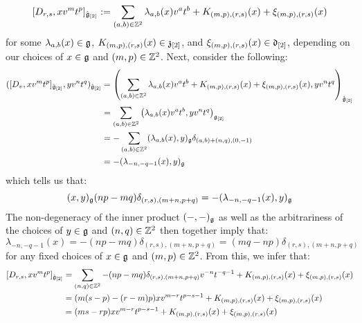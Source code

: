 \begin{remark}
\begin{enumerate}
                    $$[D_{r, s}, x v^m t^p]_{\hat{\mathfrak{g}}_{[2]}} := \sum_{(a, b) \in \mathbb{Z}^2} \lambda_{a, b}(x) v^a t^b + K_{(m, p), (r, s)}(x) + \xi_{(m, p), (r, s)}(x)$$
                for some $\lambda_{a, b}(x) \in \mathfrak{g}$, $K_{(m, p), (r, s)}(x) \in \mathfrak{z}_{[2]}$, and $\xi_{(m, p), (r, s)}(x) \in \mathfrak{d}_{[2]}$, depending on our choices of $x \in \mathfrak{g}$ and $(m, p) \in \mathbb{Z}^2$. Next, consider the following:
                    $$
                        \begin{aligned}
                            ( [D_v, x v^m t^p]_{\hat{\mathfrak{g}}_{[2]}}, y v^n t^q )_{\hat{\mathfrak{g}}_{[2]}} & = \left( \sum_{(a, b) \in \mathbb{Z}^2} \lambda_{a, b}(x) v^a t^b + K_{(m, p), (r, s)}(x) + \xi_{(m, p), (r, s)}(x), y v^n t^q \right)_{\hat{\mathfrak{g}}_{[2]}}
                            \\
                            & = \sum_{(a, b) \in \mathbb{Z}^2} \left( \lambda_{a, b}(x) v^a t^b, y v^n t^q \right)_{\mathfrak{g}_{[2]}}
                            \\
                            & = -\sum_{(a, b) \in \mathbb{Z}^2} (\lambda_{a, b}(x), y)_{\mathfrak{g}} \delta_{ (a, b) + (n, q), (0, -1) }
                            \\
                            & = -(\lambda_{-n, -q - 1}(x), y)_{\mathfrak{g}}
                        \end{aligned}
                    $$
                which tells us that:
                    $$(x, y)_{\mathfrak{g}} (np - mq) \delta_{(r, s), (m + n, p + q)} = -(\lambda_{-n, -q - 1}(x), y)_{\mathfrak{g}}$$
                The non-degeneracy of the inner product $(-, -)_{\mathfrak{g}}$ as well as the arbitrariness of the choices of $y \in \mathfrak{g}$ and $(n, q) \in \mathbb{Z}^2$ then together imply that:
                    $$\lambda_{-n, -q - 1}(x) = -(np - mq) \delta_{(r, s), (m + n, p + q)} = (mq - np) \delta_{(r, s), (m + n, p + q)}$$
                for any fixed choices of $x \in \mathfrak{g}$ and $(m, p) \in \mathbb{Z}^2$. From this, we infer that:
                    $$
                        \begin{aligned}
                            [D_{r, s}, x v^m t^p]_{\hat{\g}_{[2]}} & = \sum_{(n, q) \in \Z^2} -(np - mq) \delta_{(r, s), (m + n, p + q)} v^{-n} t^{-q - 1} + K_{(m, p), (r, s)}(x) + \xi_{(m, p), (r, s)}(x)
                            \\
                            & = ( m(s - p) - (r - m)p ) x v^{m - r} t^{p - s - 1} + K_{(m, p), (r, s)}(x) + \xi_{(m, p), (r, s)}(x)
                            \\
                            & = ( ms - rp ) x v^{m - r} t^{p - s - 1} + K_{(m, p), (r, s)}(x) + \xi_{(m, p), (r, s)}(x)
                        \end{aligned}
                    $$
                    

\end{enumerate}
\end{remark}
